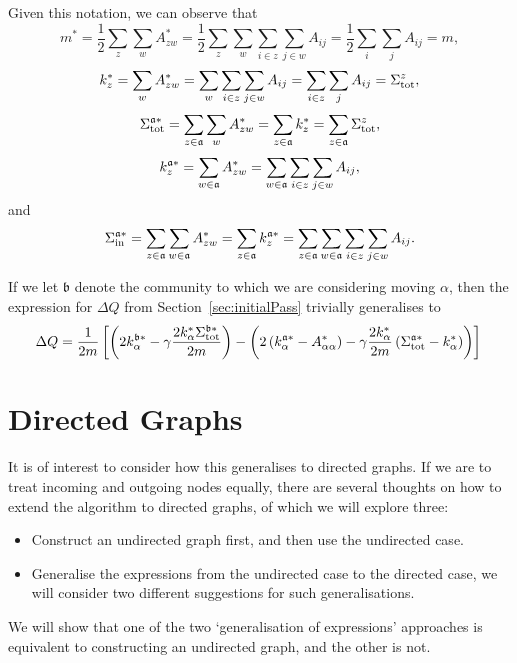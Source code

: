 \documentclass{article}
\begin{document}
Given this notation, we can observe that
\begin{equation}
m^* = \frac{1}{2}\sum_{z}\sum_{w}{A_{zw}^*} = \frac{1}{2}\sum_{z}\sum_{w}{\sum_{i \in z}\sum_{j \in w}A_{ij}} = \frac{1}{2}\sum_i\sum_jA_{ij} = m,
\end{equation}
\begin{equation}
k_{z}^* = \sum_{w}{A_{zw}^*} =  \sum_{w}{\sum_{i \in z}\sum_{j \in w}A_{ij}} = \sum_{i \in z}\sum_{j}A_{ij} = \Sigma_{\text{tot}}^{z},
\end{equation}
\begin{equation}
	\Sigma_{\text{tot}}^{\mathfrak{a} *} = \sum_{z \in \mathfrak{a}}\sum_{w}A_{zw}^* = \sum_{z \in \mathfrak{a}}k_z^* = \sum_{z \in \mathfrak{a}}\Sigma_{\text{tot}}^{z},
\end{equation}
\begin{equation}
	k_{z}^{\mathfrak{a} *} = \sum_{w \in \mathfrak{a}}{A_{zw}^*} = \sum_{w \in \mathfrak{a}}{\sum_{i \in z}\sum_{j \in w}A_{ij}},
\end{equation}
and
\begin{equation}
\Sigma_{\text{in}}^{\mathfrak{a} *} = \sum_{z \in \mathfrak{a}}\sum_{w \in \mathfrak{a}}A_{zw}^* = \sum_{z \in \mathfrak{a}}k_{z}^{\mathfrak{a} *} = \sum_{z \in \mathfrak{a}}\sum_{w \in \mathfrak{a}}{\sum_{i \in z}\sum_{j \in w}A_{ij}}.
\end{equation}

If we let $\mathfrak{b}$ denote the community to which we are considering moving $\alpha$,
then the expression for $\Delta Q$ from Section~\ref{sec:initialPass} trivially generalises to
\begin{equation}
\Delta Q = \frac{1}{2m}\left[ \left( 2 k_{\alpha}^{\mathfrak{b} *} - \gamma \frac{2k_{\alpha}^*\Sigma_{\text{tot}}^{\mathfrak{b} *}}{2m} \right) 
		- \left( 2\left( k_{\alpha}^{\mathfrak{a} *} - A_{\alpha \alpha}^* \right) - \gamma \frac{2k_{\alpha}^*}{2m} \left( \Sigma_{\text{tot}}^{\mathfrak{a} *} - k_{\alpha}^* \right ) \right) \right] \\
\end{equation}

\section{Directed Graphs}
\label{sec:directedGraphs}

It is of interest to consider how this generalises to directed graphs.
If we are to treat incoming and outgoing nodes equally, there are several
thoughts on how to extend the algorithm to directed graphs, of which we 
will explore three: 
\begin{itemize}
	\item Construct an undirected graph first, and then use the undirected case.
	\item Generalise the expressions from the undirected case to the directed case, 
	we will consider two different suggestions for such generalisations. 
\end{itemize}
We will show that one of the two `generalisation of expressions' approaches is 
equivalent to constructing an undirected graph, and the other is not.
\end{document}
